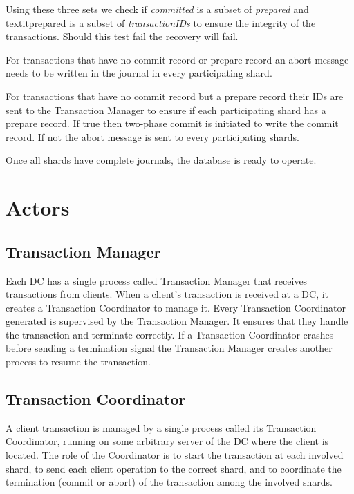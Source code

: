 \documentclass[twoside]{article}
\begin{document}
Using these three sets we check if \textit{committed} is a subset of 
\textit{prepared} and textit{prepared} is a subset of \textit{transactionIDs} 
to ensure the integrity of the transactions. 
Should this test fail the recovery will fail.

For transactions that have no commit record or prepare record an abort message 
needs to be written in the journal in every participating shard. 

For transactions that have no commit record but a prepare record their IDs are sent 
to the Transaction Manager to ensure if each participating shard has a prepare record. 
If true then two-phase commit is initiated to write the commit record. 
If not the abort message is sent to every participating shards.

Once all shards have complete journals, the database is ready to operate.



\section{Actors}
\subsection{Transaction Manager}
\label{sec:transaction-daemon}

Each DC has a single process called Transaction Manager that receives
transactions from clients.
When a client's transaction is received at a DC, it creates a Transaction
Coordinator to manage it.
Every Transaction Coordinator generated is supervised by the Transaction
Manager. 
It ensures that they handle the transaction and terminate correctly.
If a Transaction Coordinator crashes before sending a termination signal the
Transaction Manager creates another process to resume the transaction.


\subsection{Transaction Coordinator}
\label{sec:transaction-coordinator}
            
A client transaction is managed by a single process called its
Transaction Coordinator, running on some arbitrary server of the DC
where the client is located.
The role of the Coordinator is to start the transaction at each involved
shard, to send each client operation to the correct shard, and to
coordinate the termination (commit or abort) of the transaction among
the involved shards.
\end{document}
